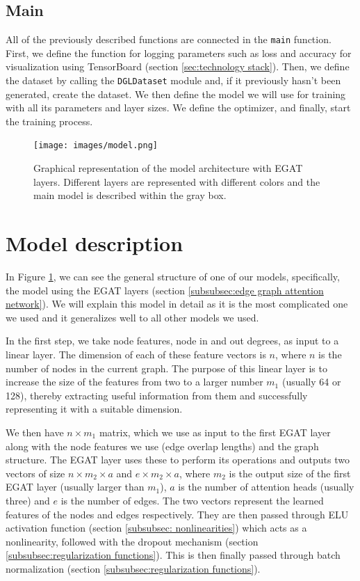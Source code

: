 \documentclass[times, utf8, diplomski, english]{fer_eng}
\begin{document}
\subsection{Main}

All of the previously described functions are connected in the \texttt{main} function. First, we define the function for logging parameters such as loss and accuracy for visualization using TensorBoard (section \ref{sec:technology stack}). Then, we define the dataset by calling the \texttt{DGLDataset} module and, if it previously hasn't been generated, create the dataset. We then define the model we will use for training with all its parameters and layer sizes. We define the optimizer, and finally, start the training process.

\begin{figure}[h]
	\centering
	\texttt{[image: images/model.png]}
	\caption[Model]{Graphical representation of the model architecture with EGAT layers. Different layers are represented with different colors and the main model is described within the gray box.}
	\label{fig:model}
\end{figure}

\section{Model description}

In Figure \ref{fig:model}, we can see the general structure of one of our models, specifically, the model using the EGAT layers (section \ref{subsubsec:edge graph attention network}). We will explain this model in detail as it is the most complicated one we used and it generalizes well to all other models we used.

In the first step, we take node features, node in and out degrees, as input to a linear layer. The dimension of each of these feature vectors is $n$, where $n$ is the number of nodes in the current graph. The purpose of this linear layer is to increase the size of the features from two to a larger number $m_1$ (usually 64 or 128), thereby extracting useful information from them and successfully representing it with a suitable dimension.

We then have $n \times m_1$ matrix, which we use as input to the first EGAT layer along with the node features we use (edge overlap lengths) and the graph structure. The EGAT layer uses these to perform its operations and outputs two vectors of size $n \times m_2 \times a$ and $e \times m_2 \times a$, where $m_2$ is the output size of the first EGAT layer (usually larger than $m_1$), $a$ is the number of attention heads (usually three) and $e$ is the number of edges. The two vectors represent the learned features of the nodes and edges respectively. They are then passed through ELU activation function (section \ref{subsubsec: nonlinearities}) which acts as a nonlinearity, followed with the dropout mechanism (section \ref{subsubsec:regularization functions}). This is then finally passed through batch normalization (section \ref{subsubsec:regularization functions}).
\end{document}
